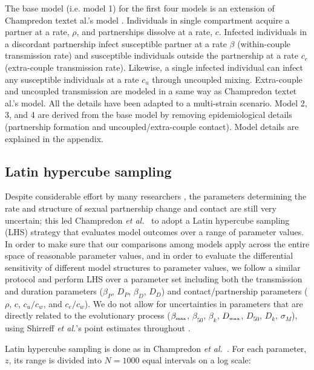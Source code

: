 \documentclass[10pt,letterpaper]{article}
\newcommand{\tsub}[2]{#1_{{\textrm{\tiny #2}}}}
\newcommand{\etal}{\textit{et al.}}
\newcommand{\tsub}[2]{#1_{{\textrm{\tiny #2}}}}
\begin{document}
The base model (i.e. model 1) for the first four models is an extension of Champredon text{et al.}'s model \cite{champredon_hiv_2013}. Individuals in single compartment acquire a partner at a rate, $\rho$, and partnerships dissolve at a rate, $c$. Infected individuals in a discordant partnership infect susceptible partner at a rate $\beta$ (within-couple transmission rate) and susceptible individuals outside the partnership at a rate $c_e$ (extra-couple transmission rate). Likewise, a single infected individual can infect any susceptible individuals at a rate $c_u$ through uncoupled mixing. Extra-couple and uncoupled transmission are modeled in a same way as Champredon text{et al.}'s model. All the details have been adapted to a multi-strain scenario. Model 2, 3, and 4 are derived from the base model by removing epidemiological details (partnership formation and uncoupled/extra-couple contact). Model details are explained in the appendix.


\subsection*{Latin hypercube sampling}

Despite considerable effort by many researchers \cite{hollingsworth_hiv1_2008,champredon_hiv_2013}, the parameters determining the rate and structure of sexual partnership change and contact are still very uncertain; this led Champredon \etal\ \cite{champredon_hiv_2013} to adopt a Latin hypercube sampling (LHS) strategy \cite{blower_drugs_1991} that evaluates model outcomes over a range of parameter values. In order to make sure that our comparisons among models apply across the entire space of reasonable parameter values, and in order to evaluate the differential sensitivity of different model structures to parameter values, we follow a similar protocol and perform LHS over a parameter set including both the transmission and duration parameters ($\beta_P$, $D_P$, $\beta_D$, $D_D$) and contact/partnership parameters ($\rho$, $c$, $c_u/c_w$, and $c_e/c_w$). We do not allow for uncertainties in parameters that are directly related to the evolutionary process ($\tsub{\beta}{max}$, $\beta_{50}$, $\beta_k$, $\tsub{D}{max}$, $D_{50}$, $D_k$, $\sigma_M$), using Shirreff \etal's point estimates throughout \cite{shirreff_transmission_2011}.

Latin hypercube sampling is done as in Champredon \etal\ \cite{champredon_hiv_2013}. For each parameter, $z$, its range is divided into $N = 1000$ equal intervals on a log scale:
\end{document}
